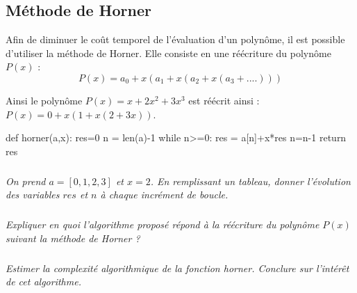 \documentclass[10pt]{article}
\begin{document}
\subsection*{Méthode de Horner}

Afin de diminuer le coût temporel de l'évaluation d'un polynôme, il est possible d'utiliser la méthode de Horner. Elle consiste en une réécriture du polynôme $P(x)$ : 
$$
P(x) = a_0 + x\left(a_1 + x \left(a_2 + x \left(a_3 + .... \right) \right) \right)
$$

Ainsi le polynôme $P(x)=x+2x^2+3x^3$ est réécrit ainsi :  
$P(x)=0+x\left( 1 + x\left(2+ 3x \right) \right)$.

\begin{py}
\begin{python}
def horner(a,x):
    res=0
    n = len(a)-1
    while n>=0:
        res = a[n]+x*res
        n=n-1 
    return res
\end{python}
\end{py}

\subparagraph{}
\textit{On prend $a=[0,1,2,3]$ et $x=2$. En remplissant un tableau, donner l'évolution des variables $res$ et $n$ à chaque incrément de boucle.}

\subparagraph{}
\textit{Expliquer en quoi l'algorithme proposé répond à la réécriture du polynôme $P(x)$ suivant la méthode de Horner ?}

\subparagraph{}
\textit{Estimer la complexité algorithmique de la fonction \textsf{horner}. Conclure sur l'intérêt de cet algorithme.}
\end{document}

